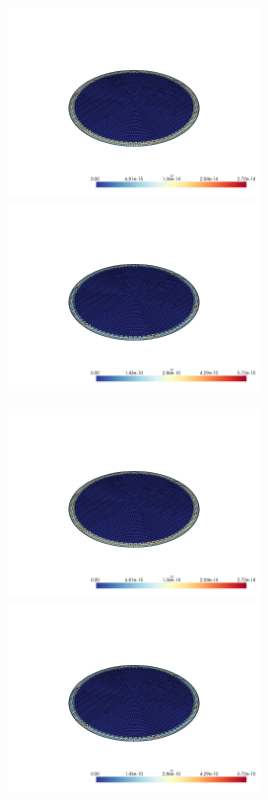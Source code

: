 \documentclass[
  11pt,
]{article}
\let\origfigure\figure
\let\endorigfigure\endfigure
\renewenvironment{figure}[1][2] {
    \expandafter\origfigure\expandafter[H]
} {
    \endorigfigure
}
\begin{document}
\begin{figure}
\caption{Finite element error in the L2 and H1 norms/seminorms, respectively for problem 1 over mesh number 4 using order 8 quadrature.}
\end{figure}

\includegraphics[width=0.5\textwidth,height=\textheight]{../img/mesh4-gauss13-L2.png}
\includegraphics[width=0.5\textwidth,height=\textheight]{../img/mesh4-gauss13-H1.png}

\begin{figure}
\caption{Finite element error in the L2 and H1 norms/seminorms, respectively for problem 1 over mesh number 4 using order 13 quadrature.}
\end{figure}

\includegraphics[width=0.5\textwidth,height=\textheight]{../img/mesh4-gauss19-L2.png}
\includegraphics[width=0.5\textwidth,height=\textheight]{../img/mesh4-gauss19-H1.png}
\end{document}
